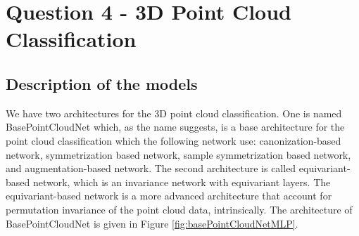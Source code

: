 \documentclass[english]{article}
\begin{document}
%

\section*{Question 4 - 3D Point Cloud Classification}  %

\subsection*{Description of the models}

We have two architectures for the 3D point cloud classification. One is named BasePointCloudNet which, as the name suggests, is a base architecture for the point cloud classification which the following network use: canonization-based network, symmetrization based network, sample symmetrization based network, and augmentation-based network.
The second architecture is called equivariant-based network, which is an invariance network with equivariant layers. The equivariant-based network is a more advanced architecture that account for permutation invariance of the point cloud data, intrinsically.
The architecture of BasePointCloudNet is given in Figure \ref{fig:basePointCloudNetMLP}.
\end{document}
